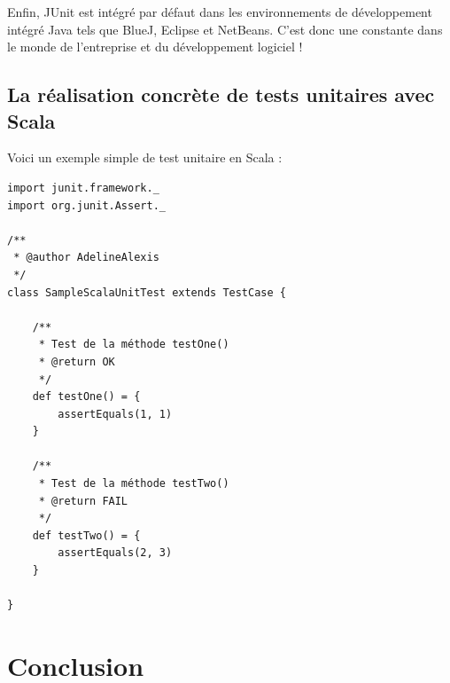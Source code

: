 \documentclass[a4paper,11pt]{article}
\begin{document}
Enfin, JUnit est intégré par défaut dans les environnements de développement intégré Java tels que BlueJ, Eclipse et NetBeans. C'est donc une constante dans le monde de l'entreprise et du développement logiciel !


\subsection{La réalisation concrète de tests unitaires avec Scala}

Voici un exemple simple de test unitaire en Scala :

\newpage
\begin{lstlisting}[caption=Exemple de TU Scala, label=java]
import junit.framework._
import org.junit.Assert._

/**
 * @author AdelineAlexis
 */
class SampleScalaUnitTest extends TestCase {

	/**
	 * Test de la méthode testOne()
	 * @return OK
	 */
	def testOne() = {
		assertEquals(1, 1)
	}

	/**
	 * Test de la méthode testTwo()
	 * @return FAIL
	 */
	def testTwo() = {
		assertEquals(2, 3)
	}

}

\end{lstlisting}	




\section{Conclusion}


\newpage
\listoffigures  %
\listoftables
\newpage
\nocite{*}
\newpage
\end{document}
